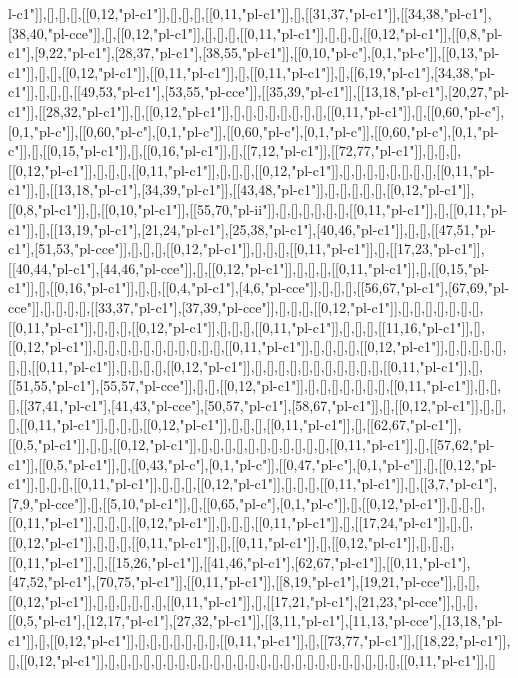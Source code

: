 l-c1"]],[],[],[],[[0,12,"pl-c1"]],[],[],[],[[0,11,"pl-c1"]],[],[[31,37,"pl-c1"]],[[34,38,"pl-c1"],[38,40,"pl-cce"]],[],[[0,12,"pl-c1"]],[],[],[],[[0,11,"pl-c1"]],[],[],[],[[0,12,"pl-c1"]],[[0,8,"pl-c1"],[9,22,"pl-c1"],[28,37,"pl-c1"],[38,55,"pl-c1"]],[[0,10,"pl-c"],[0,1,"pl-c"]],[[0,13,"pl-c1"]],[],[],[[0,12,"pl-c1"]],[[0,11,"pl-c1"]],[],[[0,11,"pl-c1"]],[],[[6,19,"pl-c1"],[34,38,"pl-c1"]],[],[],[],[[49,53,"pl-c1"],[53,55,"pl-cce"]],[[35,39,"pl-c1"]],[[13,18,"pl-c1"],[20,27,"pl-c1"]],[[28,32,"pl-c1"]],[],[[0,12,"pl-c1"]],[],[],[],[],[],[],[],[],[[0,11,"pl-c1"]],[],[[0,60,"pl-c"],[0,1,"pl-c"]],[[0,60,"pl-c"],[0,1,"pl-c"]],[[0,60,"pl-c"],[0,1,"pl-c"]],[[0,60,"pl-c"],[0,1,"pl-c"]],[],[[0,15,"pl-c1"]],[],[[0,16,"pl-c1"]],[],[[7,12,"pl-c1"]],[[72,77,"pl-c1"]],[],[],[],[[0,12,"pl-c1"]],[],[],[],[[0,11,"pl-c1"]],[],[],[],[[0,12,"pl-c1"]],[],[],[],[],[],[],[],[],[[0,11,"pl-c1"]],[],[[13,18,"pl-c1"],[34,39,"pl-c1"]],[[43,48,"pl-c1"]],[],[],[],[],[],[[0,12,"pl-c1"]],[[0,8,"pl-c1"]],[],[[0,10,"pl-c1"]],[[55,70,"pl-ii"]],[],[],[],[],[],[],[[0,11,"pl-c1"]],[],[[0,11,"pl-c1"]],[],[[13,19,"pl-c1"],[21,24,"pl-c1"],[25,38,"pl-c1"],[40,46,"pl-c1"]],[],[],[[47,51,"pl-c1"],[51,53,"pl-cce"]],[],[],[],[[0,12,"pl-c1"]],[],[],[],[[0,11,"pl-c1"]],[],[[17,23,"pl-c1"]],[[40,44,"pl-c1"],[44,46,"pl-cce"]],[],[[0,12,"pl-c1"]],[],[],[],[[0,11,"pl-c1"]],[],[[0,15,"pl-c1"]],[],[[0,16,"pl-c1"]],[],[],[[0,4,"pl-c1"],[4,6,"pl-cce"]],[],[],[],[[56,67,"pl-c1"],[67,69,"pl-cce"]],[],[],[],[],[[33,37,"pl-c1"],[37,39,"pl-cce"]],[],[],[],[[0,12,"pl-c1"]],[],[],[],[],[],[],[],[[0,11,"pl-c1"]],[],[],[],[[0,12,"pl-c1"]],[],[],[],[[0,11,"pl-c1"]],[],[],[],[[11,16,"pl-c1"]],[],[[0,12,"pl-c1"]],[],[],[],[],[],[],[],[],[],[],[],[[0,11,"pl-c1"]],[],[],[],[],[[0,12,"pl-c1"]],[],[],[],[],[],[],[],[[0,11,"pl-c1"]],[],[],[],[],[[0,12,"pl-c1"]],[],[],[],[],[],[],[],[],[],[],[],[[0,11,"pl-c1"]],[],[[51,55,"pl-c1"],[55,57,"pl-cce"]],[],[],[[0,12,"pl-c1"]],[],[],[],[],[],[],[],[[0,11,"pl-c1"]],[],[],[],[[37,41,"pl-c1"],[41,43,"pl-cce"],[50,57,"pl-c1"],[58,67,"pl-c1"]],[],[[0,12,"pl-c1"]],[],[],[],[[0,11,"pl-c1"]],[],[],[],[[0,12,"pl-c1"]],[],[],[],[[0,11,"pl-c1"]],[],[[62,67,"pl-c1"]],[[0,5,"pl-c1"]],[],[],[[0,12,"pl-c1"]],[],[],[],[],[],[],[],[],[],[],[],[[0,11,"pl-c1"]],[],[[57,62,"pl-c1"]],[[0,5,"pl-c1"]],[],[[0,43,"pl-c"],[0,1,"pl-c"]],[[0,47,"pl-c"],[0,1,"pl-c"]],[],[[0,12,"pl-c1"]],[],[],[],[[0,11,"pl-c1"]],[],[],[],[[0,12,"pl-c1"]],[],[],[],[[0,11,"pl-c1"]],[],[[3,7,"pl-c1"],[7,9,"pl-cce"]],[],[[5,10,"pl-c1"]],[],[[0,65,"pl-c"],[0,1,"pl-c"]],[],[[0,12,"pl-c1"]],[],[],[],[[0,11,"pl-c1"]],[],[],[],[[0,12,"pl-c1"]],[],[],[],[[0,11,"pl-c1"]],[],[[17,24,"pl-c1"]],[],[],[[0,12,"pl-c1"]],[],[],[],[[0,11,"pl-c1"]],[],[[0,11,"pl-c1"]],[],[[0,12,"pl-c1"]],[],[],[],[[0,11,"pl-c1"]],[],[[15,26,"pl-c1"]],[[41,46,"pl-c1"],[62,67,"pl-c1"]],[[0,11,"pl-c1"],[47,52,"pl-c1"],[70,75,"pl-c1"]],[[0,11,"pl-c1"]],[[8,19,"pl-c1"],[19,21,"pl-cce"]],[],[],[[0,12,"pl-c1"]],[],[],[],[],[],[],[[0,11,"pl-c1"]],[],[[17,21,"pl-c1"],[21,23,"pl-cce"]],[],[],[[0,5,"pl-c1"],[12,17,"pl-c1"],[27,32,"pl-c1"]],[[3,11,"pl-c1"],[11,13,"pl-cce"],[13,18,"pl-c1"]],[],[[0,12,"pl-c1"]],[],[],[],[],[],[],[],[[0,11,"pl-c1"]],[],[[73,77,"pl-c1"]],[[18,22,"pl-c1"]],[],[[0,12,"pl-c1"]],[],[],[],[],[],[],[],[],[],[],[],[],[],[],[],[],[],[],[],[],[],[],[],[],[],[[0,11,"pl-c1"]],[]